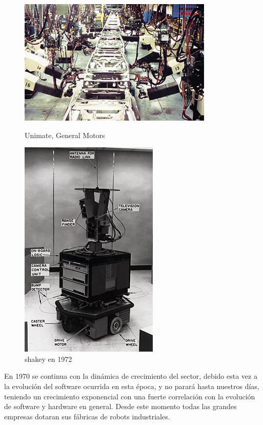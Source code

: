 \begin{figure}[!htb]
	\begin{minipage}{0.48\textwidth}
    	\centering
     	\includegraphics[scale=0.5]{img/unimate.jpg}
  		\caption{Unimate, General Motors}
  		\label{fig:unimate}
   	\end{minipage}\hfill
   	\begin {minipage}{0.48\textwidth}
     	\centering
     	\includegraphics[scale=0.5]{img/shakey.jpg}
     	\caption{shakey en 1972}
     	\label{fig:shakey}
	\end{minipage}
\end{figure}

En 1970 se continua con la dinámica de crecimiento del sector, debido esta vez a la evolución del software ocurrida en esta época, y no parará hasta nuestros días, teniendo un crecimiento exponencial con una fuerte correlación con la evolución de software y hardware en general.
Desde este momento todas las grandes empresas dotaran sus fábricas de robots industriales. 

